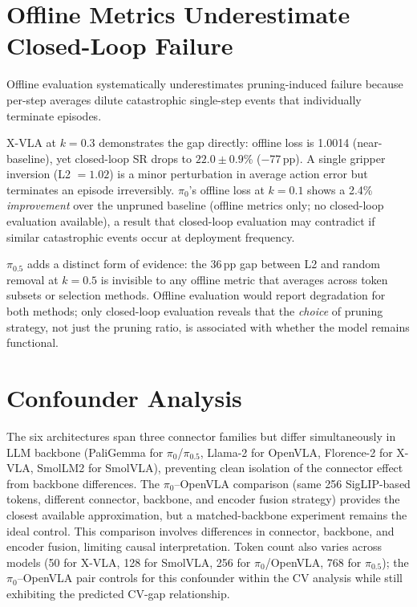 \section{Offline Metrics Underestimate Closed-Loop Failure}
\label{app:offline_disconnect}
\label{sec:metric_disconnect}

Offline evaluation systematically underestimates pruning-induced failure because per-step averages dilute catastrophic single-step events that individually terminate episodes.

X-VLA at $k{=}0.3$ demonstrates the gap directly: offline loss is 1.0014 (near-baseline), yet closed-loop SR drops to $22.0 \pm 0.9$\% ($-$77\,pp). A single gripper inversion (L2 $= 1.02$) is a minor perturbation in average action error but terminates an episode irreversibly. $\pi_{0}$'s offline loss at $k{=}0.1$ shows a 2.4\% \emph{improvement} over the unpruned baseline (offline metrics only; no closed-loop evaluation available), a result that closed-loop evaluation may contradict if similar catastrophic events occur at deployment frequency.

$\pi_{0.5}$ adds a distinct form of evidence: the 36\,pp gap between L2 and random removal at $k{=}0.5$ is invisible to any offline metric that averages across token subsets or selection methods. Offline evaluation would report degradation for both methods; only closed-loop evaluation reveals that the \emph{choice} of pruning strategy, not just the pruning ratio, is associated with whether the model remains functional.


\section{Confounder Analysis}
\label{app:confounders}

The six architectures span three connector families but differ simultaneously in LLM backbone (PaliGemma for $\pi_{0}$/$\pi_{0.5}$, Llama-2 for OpenVLA, Florence-2 for X-VLA, SmolLM2 for SmolVLA), preventing clean isolation of the connector effect from backbone differences. The $\pi_{0}$--OpenVLA comparison (same 256 SigLIP-based tokens, different connector, backbone, and encoder fusion strategy) provides the closest available approximation, but a matched-backbone experiment remains the ideal control. This comparison involves differences in connector, backbone, and encoder fusion, limiting causal interpretation. Token count also varies across models (50 for X-VLA, 128 for SmolVLA, 256 for $\pi_{0}$/OpenVLA, 768 for $\pi_{0.5}$); the $\pi_{0}$--OpenVLA pair controls for this confounder within the CV analysis while still exhibiting the predicted CV-gap relationship.

